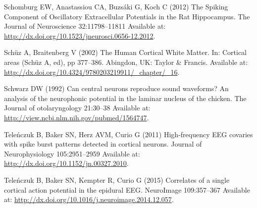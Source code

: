 \documentclass[]{article}
\begin{document}
\hypertarget{ref-Schomburg2012Spiking}{}
Schomburg EW, Anastassiou CA, Buzsáki G, Koch C (2012) The Spiking
Component of Oscillatory Extracellular Potentials in the Rat
Hippocampus. The Journal of Neuroscience 32:11798--11811 Available at:
\url{http://dx.doi.org/10.1523/jneurosci.0656-12.2012}.

\hypertarget{ref-Schuz2002Human}{}
Schüz A, Braitenberg V (2002) The Human Cortical White Matter. In:
Cortical areas (Schüz A, ed), pp 377--386. Abingdon, UK: Taylor \&
Francis. Available at:
\url{http://dx.doi.org/10.4324/9780203219911/_chapter/_16}.

\hypertarget{ref-Schwarz1992Can}{}
Schwarz DW (1992) Can central neurons reproduce sound waveforms? An
analysis of the neurophonic potential in the laminar nucleus of the
chicken. The Journal of otolaryngology 21:30--38 Available at:
\url{http://view.ncbi.nlm.nih.gov/pubmed/1564747}.

\hypertarget{ref-Telenczuk2011Highfrequency}{}
Teleńczuk B, Baker SN, Herz AVM, Curio G (2011) High-frequency EEG
covaries with spike burst patterns detected in cortical neurons. Journal
of Neurophysiology 105:2951--2959 Available at:
\url{http://dx.doi.org/10.1152/jn.00327.2010}.

\hypertarget{ref-Telenczuk2015Correlates}{}
Teleńczuk B, Baker SN, Kempter R, Curio G (2015) Correlates of a single
cortical action potential in the epidural EEG. NeuroImage 109:357--367
Available at: \url{http://dx.doi.org/10.1016/j.neuroimage.2014.12.057}.
\end{document}
